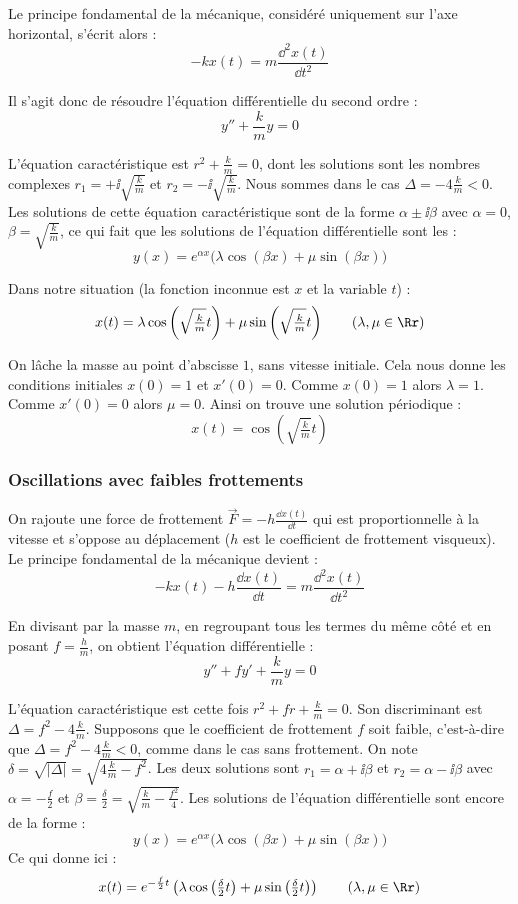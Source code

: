 \documentclass[class=report,crop=false]{standalone}
\begin{document}
Le principe fondamental de la mécanique, considéré uniquement sur l'axe horizontal,
s'écrit alors :
$$-kx(t) = m\frac{\dd^2 x(t)}{\dd t^2}$$

Il s'agit donc de résoudre l'équation différentielle du second ordre :
$$y'' + \frac{k}{m} y = 0$$

L'équation caractéristique est $r^2+\frac{k}{m} = 0$,
dont les solutions sont les nombres complexes
$r_1 = +\ii\sqrt{\frac{k}{m}}$ et $r_2 = -\ii\sqrt{\frac{k}{m}}$.
Nous sommes dans le cas $\Delta = -4\frac{k}{m} <0$.
Les solutions de cette équation caractéristique sont de la forme
$\alpha \pm \ii \beta$ avec $\alpha=0$, $\beta = \sqrt{\frac{k}{m}}$,
ce qui fait que les solutions de l'équation différentielle sont
les :
$$y(x) = e^{\alpha x}\big(\lambda\cos (\beta x)+\mu\sin (\beta x)\big)$$

Dans notre situation (la fonction inconnue est $x$ et la variable $t$) :
$$x(t) = \lambda\cos \left(\sqrt{\tfrac{k}{m}}t\right)
+\mu\sin \left(\sqrt{\tfrac{k}{m}}t\right)
\qquad (\lambda, \mu \in \Rr)$$

\begin{exemple}
On lâche la masse au point d'abscisse $1$, sans vitesse initiale.
Cela nous donne les conditions initiales
$x(0)=1$ et $x'(0)=0$.
Comme $x(0)=1$ alors $\lambda=1$. Comme
$x'(0) = 0$ alors $\mu = 0$.
Ainsi on trouve une solution périodique :
$$x(t) = \cos \left(\sqrt{\tfrac{k}{m}}t\right)$$

\end{exemple}


\subsubsection*{Oscillations avec faibles frottements}

On rajoute une force de frottement $\vec F =  - h \frac{\dd x(t)}{\dd t}$
qui est proportionnelle à la vitesse et s'oppose au déplacement
($h$ est le coefficient de frottement visqueux).
Le principe fondamental de la mécanique devient :
$$-kx(t)- h \frac{\dd x(t)}{\dd t} = m\frac{\dd^2 x(t)}{\dd t^2}$$

En divisant par la masse $m$, en regroupant tous les termes du même côté et en posant $f = \frac{h}{m}$, on obtient l'équation différentielle :
$$y'' + f y' + \frac{k}{m} y = 0$$

L'équation caractéristique est cette fois $r^2+fr+\frac{k}{m}=0$.
Son discriminant est  $\Delta = f^2-4\frac{k}{m}$.
Supposons que le coefficient de frottement $f$ soit faible, c'est-à-dire
que $\Delta = f^2-4\frac{k}{m} <0$, comme dans le cas sans frottement.
On note $\delta = \sqrt{|\Delta|} = \sqrt{4\frac{k}{m} - f^{2}}$.
Les deux solutions sont
$r_1 = \alpha + \ii \beta$ et $r_2 = \alpha - \ii \beta$ avec
$\alpha = -\frac{f}{2}$ et $\beta = \frac{\delta}{2} = \sqrt{\frac{k}{m} - \frac{f^{2}}{4}}$.
Les solutions de l'équation différentielle sont encore de la forme :
$$y(x) = e^{\alpha x}\big(\lambda\cos (\beta x)+\mu\sin (\beta x)\big)$$
Ce qui donne ici :
$$x(t) = e^{-\frac{f}{2} t}\left(\lambda\cos \left(\tfrac{\delta}{2}t\right)
+\mu\sin \left(\tfrac{\delta}{2}t\right)\right)\qquad (\lambda, \mu \in \Rr)$$
\end{document}
